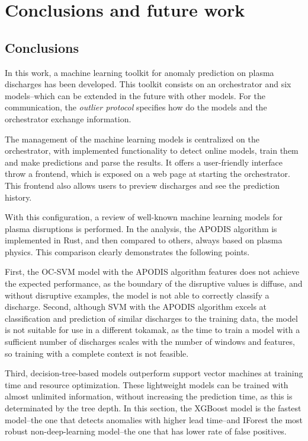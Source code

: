 \chapter{Conclusions and future work}\label{sec:cap7}

\section{Conclusions}

In this work, a machine learning toolkit for anomaly prediction on plasma discharges has been developed. This toolkit consists on an orchestrator and six models--which can be extended in the future with other models. For the communication, the \textit{outlier protocol} specifies how do the models and the orchestrator exchange information.

The management of the machine learning models is centralized on the orchestrator, with implemented functionality to detect online models, train them and make predictions and parse the results. It offers a user-friendly interface throw a frontend, which is exposed on a web page at starting the orchestrator. This frontend also allows users to preview discharges and see the prediction history. 

With this configuration, a review of well-known machine learning models for plasma disruptions is performed. In the analysis, the \ac{APODIS} algorithm is implemented in Rust, and then compared to others, always based on plasma physics. This comparison clearly demonstrates the following points.

First, the \ac{OC-SVM} model with the \ac{APODIS} algorithm features does not achieve the expected performance, as the boundary of the disruptive values is diffuse, and without disruptive examples, the model is not able to correctly classify a discharge. Second, although \ac{SVM} with the \ac{APODIS} algorithm excels at classification and prediction of similar discharges to the training data, the model is not suitable for use in a different tokamak, as the time to train a model with a sufficient number of discharges scales with the number of windows and features, so training with a complete context is not feasible.

Third, decision-tree-based models outperform support vector machines at training time and resource optimization. These lightweight models can be trained with almost unlimited information, without increasing the prediction time, as this is determinated by the tree depth. In this section, the XGBoost model is the fastest model--the one that detects anomalies with higher lead time--and \ac{IForest} the most robust non-deep-learning model--the one that has lower rate of false positives.

